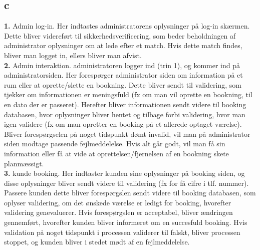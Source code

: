 \documentclass[12pt,a4paper]{article}
\begin{document}
\subsection{c}
\textbf{1.} Admin log-in. Her indtastes administratorens oplysninger på log-in skærmen. Dette bliver 	videreført til sikkerhedsverificering, som beder beholdningen af administrator oplysninger 	om at lede efter et match. Hvis dette match findes, bliver man logget in, ellers bliver man 	afvist. \\
	\textbf{2.} Admin interaktion. administratoren logger ind (trin 1), og kommer ind på 	administratorsiden. Her forespørger administrator siden om information på et rum eller at 	oprette/slette en bookning. Dette bliver sendt til validering, som tjekker om informationen er 	meningsfuld (fx om man vil oprette en bookning, til en dato der er passeret). Herefter bliver 	informationen sendt videre til booking databasen, hvor oplysninger bliver hentet og tilbage 	forbi validering, hvor man igen validere (fx om man opretter en booking på et allerede 	optaget værelse). Bliver forespørgselen på noget tidspunkt dømt invalid, vil man på 	administrator siden modtage passende fejlmeddelelse. Hvis alt går godt, vil man få sin 	information eller få at vide at oprettelsen/fjernelsen af en bookning skete planmæssigt.\\
	\textbf{3.} kunde booking. Her indtaster kunden sine oplysninger på booking siden, og disse 	oplysninger bliver sendt videre til validering (fx for få cifre i tlf. nummer). Passere kunden 	dette bliver forespørgslen sendt videre til booking databasen, som oplyser validering, om det 	ønskede værelse er ledigt for booking, hvorefter validering genevaluerer. Hvis forespørgslen 	er acceptabel, bliver ændringen gennemført, hvorefter kunden bliver informeret om en 		succesfuld booking. Hvis validation på noget tidspunkt i processen validerer til falskt, bliver 	processen stoppet, og kunden bliver i stedet mødt af en fejlmeddelelse.
\end{document}
